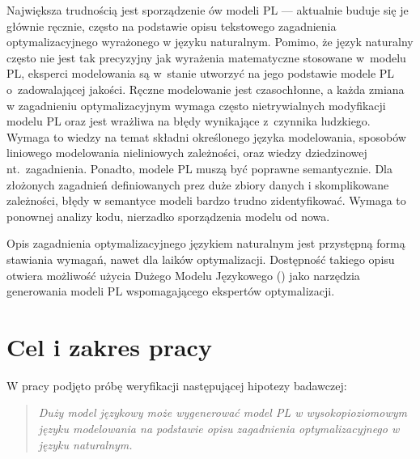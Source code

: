 Największa trudnością jest sporządzenie ów modeli PL --- aktualnie buduje się je głównie ręcznie, często na podstawie opisu tekstowego zagadnienia optymalizacyjnego wyrażonego w języku naturalnym.  Pomimo, że język naturalny często nie jest tak precyzyjny jak wyrażenia matematyczne stosowane w~modelu PL, eksperci modelowania są w~stanie utworzyć na jego podstawie modele PL o~zadowalającej jakości.
Ręczne modelowanie jest czasochłonne, a każda zmiana w zagadnieniu optymalizacyjnym wymaga często nietrywialnych modyfikacji modelu PL oraz jest wrażliwa na błędy wynikające z~czynnika ludzkiego. Wymaga to wiedzy na temat składni określonego języka modelowania, sposobów liniowego modelowania nieliniowych zależności, oraz wiedzy dziedzinowej nt.~zagadnienia.
Ponadto, modele PL muszą być poprawne semantycznie. %
Dla złożonych zagadnień definiowanych prez duże zbiory danych i skomplikowane zależności, błędy w semantyce modeli bardzo trudno zidentyfikować. Wymaga to ponownej analizy kodu, nierzadko sporządzenia modelu od nowa.

Opis zagadnienia optymalizacyjnego językiem naturalnym jest przystępną formą stawiania wymagań, nawet dla laików optymalizacji. Dostępność takiego opisu otwiera możliwość użycia Dużego Modelu Językowego ()  jako narzędzia generowania modeli PL wspomagającego ekspertów optymalizacji.



\section{Cel i zakres pracy}\label{sec:intro:aim}

W pracy podjęto próbę weryfikacji następującej hipotezy badawczej:
\begin{quote}
\textit{Duży model językowy może wygenerować model PL w wysokopioziomowym języku modelowania na podstawie opisu zagadnienia optymalizacyjnego w języku naturalnym.}
\end{quote}


